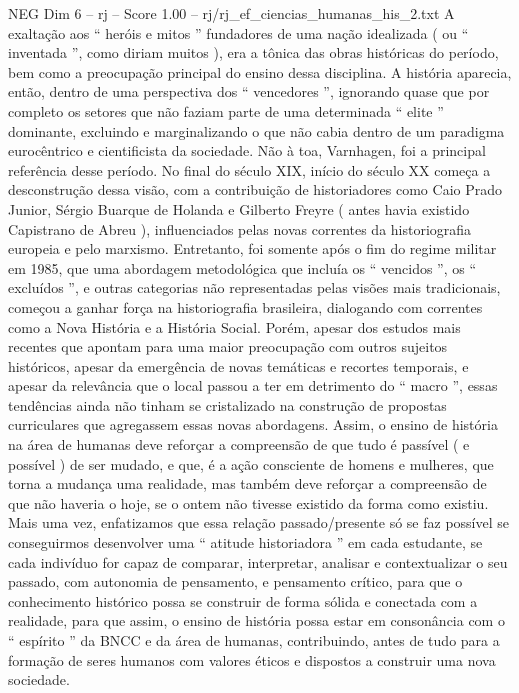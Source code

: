 \begin{textsample}{NEG Dim 6 – rj – Score 1.00 – rj/rj\_ef\_ciencias\_humanas\_his\_2.txt}
A exaltação aos “ heróis e mitos ” fundadores de uma nação idealizada ( ou “ inventada ”, como diriam muitos ), era a tônica das obras históricas do período, bem como a preocupação principal do ensino dessa disciplina.
A história aparecia, então, dentro de uma perspectiva dos “ vencedores ”, ignorando quase que por completo os setores que não faziam parte de uma determinada “ elite ” dominante, excluindo e marginalizando o que não cabia dentro de um paradigma eurocêntrico e cientificista da sociedade.
Não à toa, Varnhagen, foi a principal referência desse período.
No final do século XIX, início do século XX começa a desconstrução dessa visão, com a contribuição de historiadores como Caio Prado Junior, Sérgio Buarque de Holanda e Gilberto Freyre ( antes havia existido Capistrano de Abreu ), influenciados pelas novas correntes da historiografia europeia e pelo marxismo.
Entretanto, foi somente após o fim do regime militar em 1985, que uma abordagem metodológica que incluía os “ vencidos ”, os “ excluídos ”, e outras categorias não representadas pelas visões mais tradicionais, começou a ganhar força na historiografia brasileira, dialogando com correntes como a Nova História e a História Social.
Porém, apesar dos estudos mais recentes que apontam para uma maior preocupação com outros sujeitos históricos, apesar da emergência de novas temáticas e recortes temporais, e apesar da relevância que o local passou a ter em detrimento do “ macro ”, essas tendências ainda não tinham se cristalizado na construção de propostas curriculares que agregassem essas novas abordagens.
Assim, o ensino de história na área de humanas deve reforçar a compreensão de que tudo é passível ( e possível ) de ser mudado, e que, é a ação consciente de homens e mulheres, que torna a mudança uma realidade, mas também deve reforçar a compreensão de que não haveria o hoje, se o ontem não tivesse existido da forma como existiu.
Mais uma vez, enfatizamos que essa relação passado/presente só se faz possível se conseguirmos desenvolver uma “ atitude historiadora ” em cada estudante, se cada indivíduo for capaz de comparar, interpretar, analisar e contextualizar o seu passado, com autonomia de pensamento, e pensamento crítico, para que o conhecimento histórico possa se construir de forma sólida e conectada com a realidade, para que assim, o ensino de história possa estar em consonância com o “ espírito ” da BNCC e da área de humanas, contribuindo, antes de tudo para a formação de seres humanos com valores éticos e dispostos a construir uma nova sociedade.

\end{textsample}
